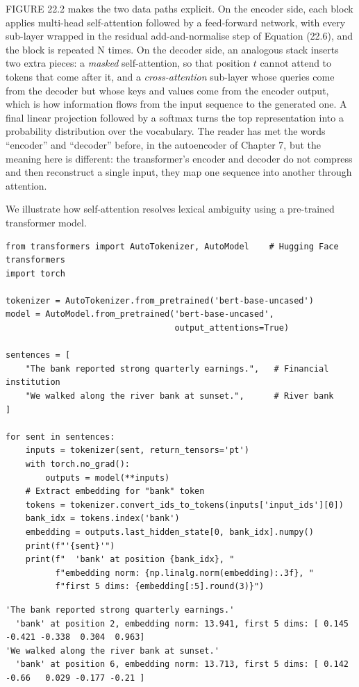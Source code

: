 FIGURE 22.2 makes the two data paths explicit. On the encoder side, each block applies multi-head self-attention followed by a feed-forward network, with every sub-layer wrapped in the residual add-and-normalise step of Equation (22.6), and the block is repeated N times. On the decoder side, an analogous stack inserts two extra pieces: a \textit{masked} self-attention, so that position $t$ cannot attend to tokens that come after it, and a \textit{cross-attention} sub-layer whose queries come from the decoder but whose keys and values come from the encoder output, which is how information flows from the input sequence to the generated one. A final linear projection followed by a softmax turns the top representation into a probability distribution over the vocabulary. The reader has met the words ``encoder'' and ``decoder'' before, in the autoencoder of Chapter 7, but the meaning here is different: the transformer's encoder and decoder do not compress and then reconstruct a single input, they map one sequence into another through attention.

We illustrate how self-attention resolves lexical ambiguity using a pre-trained transformer model.

\begin{verbatim}
from transformers import AutoTokenizer, AutoModel    # Hugging Face transformers
import torch

tokenizer = AutoTokenizer.from_pretrained('bert-base-uncased')
model = AutoModel.from_pretrained('bert-base-uncased',
                                  output_attentions=True)

sentences = [
    "The bank reported strong quarterly earnings.",   # Financial institution
    "We walked along the river bank at sunset.",      # River bank
]

for sent in sentences:
    inputs = tokenizer(sent, return_tensors='pt')
    with torch.no_grad():
        outputs = model(**inputs)
    # Extract embedding for "bank" token
    tokens = tokenizer.convert_ids_to_tokens(inputs['input_ids'][0])
    bank_idx = tokens.index('bank')
    embedding = outputs.last_hidden_state[0, bank_idx].numpy()
    print(f"'{sent}'")
    print(f"  'bank' at position {bank_idx}, "
          f"embedding norm: {np.linalg.norm(embedding):.3f}, "
          f"first 5 dims: {embedding[:5].round(3)}")
\end{verbatim}

\begin{verbatim}
'The bank reported strong quarterly earnings.'
  'bank' at position 2, embedding norm: 13.941, first 5 dims: [ 0.145 -0.421 -0.338  0.304  0.963]
'We walked along the river bank at sunset.'
  'bank' at position 6, embedding norm: 13.713, first 5 dims: [ 0.142 -0.66   0.029 -0.177 -0.21 ]
\end{verbatim}

